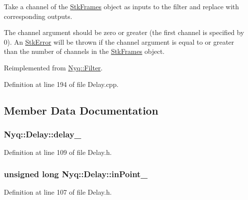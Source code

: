 Take a channel of the \hyperlink{class_nyq_1_1_stk_frames}{Stk\+Frames} object as inputs to the filter and replace with corresponding outputs. 

The {\ttfamily channel} argument should be zero or greater (the first channel is specified by 0). An \hyperlink{class_nyq_1_1_stk_error}{Stk\+Error} will be thrown if the {\ttfamily channel} argument is equal to or greater than the number of channels in the \hyperlink{class_nyq_1_1_stk_frames}{Stk\+Frames} object. 

Reimplemented from \hyperlink{class_nyq_1_1_filter_ab4ae4f8ac8794885189d3970f6561485}{Nyq\+::\+Filter}.



Definition at line 194 of file Delay.\+cpp.



\subsection{Member Data Documentation}
\subsubsection[{\texorpdfstring{delay\+\_\+}{delay_}}]{ Nyq\+::\+Delay\+::delay\+\_\+\hspace{0.3cm}{\ttfamily [protected]}}\hypertarget{class_nyq_1_1_delay_af2a95a6acc9b4073b670e23994351699}{}\label{class_nyq_1_1_delay_af2a95a6acc9b4073b670e23994351699}


Definition at line 109 of file Delay.\+h.

\subsubsection[{\texorpdfstring{in\+Point\+\_\+}{inPoint_}}]{\setlength{\rightskip}{0pt plus 5cm}unsigned long Nyq\+::\+Delay\+::in\+Point\+\_\+\hspace{0.3cm}{\ttfamily [protected]}}\hypertarget{class_nyq_1_1_delay_ac5deb6e923f40803da4dbfafc6d522ea}{}\label{class_nyq_1_1_delay_ac5deb6e923f40803da4dbfafc6d522ea}


Definition at line 107 of file Delay.\+h.

